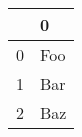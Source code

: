 \begin{tabular}{ll}
\toprule
{} &    0 \\
\midrule
0 &  Foo \\
1 &  Bar \\
2 &  Baz \\
\bottomrule
\end{tabular}
